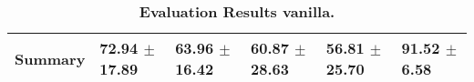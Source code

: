 \begin{table}[htb]
{\begin{tabular}{llllll}
\midrule
\textbf{Summary                                  } &                  \phantom{0}72.94 $\pm$ 17.89 &                      \phantom{0}63.96 $\pm$ 16.42 &                  \phantom{0}60.87 $\pm$ 28.63 &                  \phantom{0}56.81 $\pm$ 25.70 &  \phantom{0}91.52 $\pm$ \phantom{0}6.58 \\
\bottomrule
\end{tabular}%
}
\caption{\textbf{Evaluation Results vanilla.}}
\label{tab:eval-results}
\end{table}


